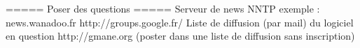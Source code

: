 ===== Poser des questions =====
Serveur de news NNTP exemple : news.wanadoo.fr
http://groups.google.fr/
Liste de diffusion (par mail) du logiciel en question
http://gmane.org (poster dans une liste de diffusion sans inscription)

